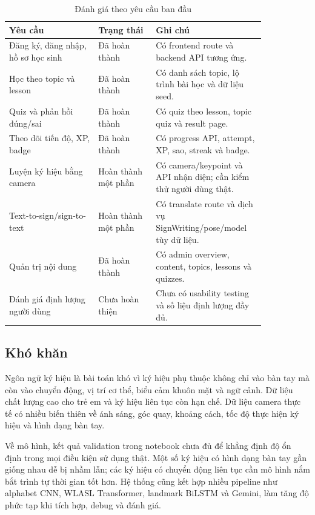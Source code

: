 \documentclass[conference]{IEEEtran}
\begin{document}
\begin{table}[htbp]
\caption{Đánh giá theo yêu cầu ban đầu}
\begin{center}
\footnotesize
\begin{tabular}{|p{0.31\linewidth}|p{0.20\linewidth}|p{0.33\linewidth}|}
\hline
\textbf{Yêu cầu} & \textbf{Trạng thái} & \textbf{Ghi chú} \\
\hline
Đăng ký, đăng nhập, hồ sơ học sinh & Đã hoàn thành & Có frontend route và backend API tương ứng. \\
\hline
Học theo topic và lesson & Đã hoàn thành & Có danh sách topic, lộ trình bài học và dữ liệu seed. \\
\hline
Quiz và phản hồi đúng/sai & Đã hoàn thành & Có quiz theo lesson, topic quiz và result page. \\
\hline
Theo dõi tiến độ, XP, badge & Đã hoàn thành & Có progress API, attempt, XP, sao, streak và badge. \\
\hline
Luyện ký hiệu bằng camera & Hoàn thành một phần & Có camera/keypoint và API nhận diện; cần kiểm thử người dùng thật. \\
\hline
Text-to-sign/sign-to-text & Hoàn thành một phần & Có translate route và dịch vụ SignWriting/pose/model tùy dữ liệu. \\
\hline
Quản trị nội dung & Đã hoàn thành & Có admin overview, content, topics, lessons và quizzes. \\
\hline
Đánh giá định lượng người dùng & Chưa hoàn thiện & Chưa có usability testing và số liệu định lượng đầy đủ. \\
\hline
\end{tabular}
\label{tab:req-status}
\end{center}
\end{table}

\subsection{Khó khăn}
Ngôn ngữ ký hiệu là bài toán khó vì ký hiệu phụ thuộc không chỉ vào bàn tay mà còn vào chuyển động, vị trí cơ thể, biểu cảm khuôn mặt và ngữ cảnh. Dữ liệu chất lượng cao cho trẻ em và ký hiệu liên tục còn hạn chế. Dữ liệu camera thực tế có nhiều biến thiên về ánh sáng, góc quay, khoảng cách, tốc độ thực hiện ký hiệu và hình dạng bàn tay.

Về mô hình, kết quả validation trong notebook chưa đủ để khẳng định độ ổn định trong mọi điều kiện sử dụng thật. Một số ký hiệu có hình dạng bàn tay gần giống nhau dễ bị nhầm lẫn; các ký hiệu có chuyển động liên tục cần mô hình nắm bắt trình tự thời gian tốt hơn. Hệ thống cũng kết hợp nhiều pipeline như alphabet CNN, WLASL Transformer, landmark BiLSTM và Gemini, làm tăng độ phức tạp khi tích hợp, debug và đánh giá.
\end{document}
